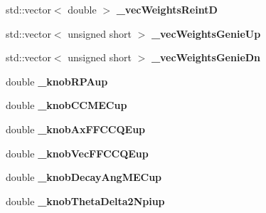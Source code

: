 \begin{DoxyCompactItemize}
\item 
std\+::vector$<$ double $>$ {\bfseries \+\_\+vec\+Weights\+ReintD}\hypertarget{classanalysis_1_1EventWeightTree_a69730a17bff09c41342182ad65207cbd}{}\label{classanalysis_1_1EventWeightTree_a69730a17bff09c41342182ad65207cbd}

\item 
std\+::vector$<$ unsigned short $>$ {\bfseries \+\_\+vec\+Weights\+Genie\+Up}\hypertarget{classanalysis_1_1EventWeightTree_a09a1adba2705974f84d0dba2580997e4}{}\label{classanalysis_1_1EventWeightTree_a09a1adba2705974f84d0dba2580997e4}

\item 
std\+::vector$<$ unsigned short $>$ {\bfseries \+\_\+vec\+Weights\+Genie\+Dn}\hypertarget{classanalysis_1_1EventWeightTree_a066316d81723e6295917625d74622ee1}{}\label{classanalysis_1_1EventWeightTree_a066316d81723e6295917625d74622ee1}

\item 
double {\bfseries \+\_\+knob\+R\+P\+Aup}\hypertarget{classanalysis_1_1EventWeightTree_a74fc24673f14fdd10005a3f6dfd82e94}{}\label{classanalysis_1_1EventWeightTree_a74fc24673f14fdd10005a3f6dfd82e94}

\item 
double {\bfseries \+\_\+knob\+C\+C\+M\+E\+Cup}\hypertarget{classanalysis_1_1EventWeightTree_a0c942a4125790cb86c5bbec5fde66c30}{}\label{classanalysis_1_1EventWeightTree_a0c942a4125790cb86c5bbec5fde66c30}

\item 
double {\bfseries \+\_\+knob\+Ax\+F\+F\+C\+C\+Q\+Eup}\hypertarget{classanalysis_1_1EventWeightTree_adc87649aa6775d3530e23d717871d70c}{}\label{classanalysis_1_1EventWeightTree_adc87649aa6775d3530e23d717871d70c}

\item 
double {\bfseries \+\_\+knob\+Vec\+F\+F\+C\+C\+Q\+Eup}\hypertarget{classanalysis_1_1EventWeightTree_aebaf927cd15e31836c495a1d6f84ab74}{}\label{classanalysis_1_1EventWeightTree_aebaf927cd15e31836c495a1d6f84ab74}

\item 
double {\bfseries \+\_\+knob\+Decay\+Ang\+M\+E\+Cup}\hypertarget{classanalysis_1_1EventWeightTree_ab1625c0defcb944623639a2493c3c9fc}{}\label{classanalysis_1_1EventWeightTree_ab1625c0defcb944623639a2493c3c9fc}

\item 
double {\bfseries \+\_\+knob\+Theta\+Delta2\+Npiup}\hypertarget{classanalysis_1_1EventWeightTree_af08b779f2f8b9ce71aa00cef83c4c4f1}{}\label{classanalysis_1_1EventWeightTree_af08b779f2f8b9ce71aa00cef83c4c4f1}


\end{DoxyCompactItemize}
